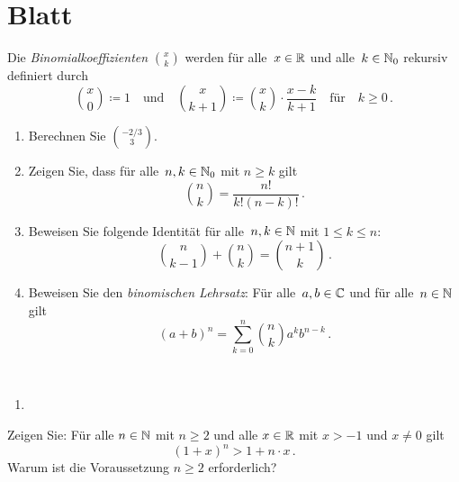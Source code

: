 \section{Blatt}

\begin{aufg}[8 Punkte] 
Die \textit{Binomialkoeffizienten} ${x\choose k}$ werden f\"ur alle~$x\in \mathbb{R}$ und alle~$ k\in \mathbb{N}_0$ rekursiv definiert durch 
\[
{ x\choose 0 } \coloneqq 1 \quad\text{und} \quad {x\choose k+1} \coloneqq {x\choose k }\cdot\frac{x-k}{k+1} \quad\text{f\"ur} \quad k\geq 0\,.
\]
\begin{enumerate}[label=$\mathrm{(\roman*)}$, ref=$\mathrm{\roman*}$]
\item Berechnen Sie ${-2/3 \choose 3}$.
\item Zeigen Sie, dass f\"ur alle~$n, k\in \mathbb{N}_0$ mit $n\geq k$ gilt
\[
{ n \choose k } = \frac{n!}{k!(n-k)!}\,. 
\]
\item Beweisen Sie folgende Identit\"at f\"ur alle~$n, k\in \mathbb{N}$ mit $1\leq k\leq n$:
\[
{ n \choose k-1 } + { n \choose k } = { n+1 \choose k }\,.
\]
\item Beweisen Sie den \textit{binomischen Lehrsatz}: F\"ur alle~$a,b\in \mathbb{C}$ und f\"ur alle~$n\in \mathbb{N}$ gilt
\[
(a+b)^{n} = \sum_{k=0}^{n} { n \choose k }a^{k}b^{n-k}\,.  
\]
\end{enumerate}
\end{aufg}


\bigskip

\begin{lsg}\mbox{ }
\begin{enumerate}[label=$\mathrm{(\roman*)}$, ref=$\mathrm{\roman*}$]
\item 
\end{enumerate}
\end{lsg}

\bigskip



\begin{aufg}[4 Punkte]
Zeigen Sie: Für alle $n\in \mathbb{N}$ mit $n\ge2$ und alle $x\in\mathbb{R}$ mit $x>-1$ und $x\neq0$ gilt 
\[
(1+x)^n> 1+n\cdot x\,.
\]
Warum ist die Voraussetzung $n\ge2$ erforderlich?
\end{aufg}
 

\bigskip

